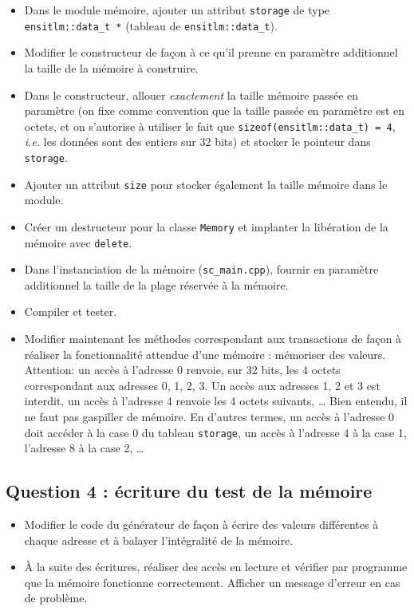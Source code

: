 \documentclass[12pt,a4paper]{article}
\begin{document}
\begin{itemize}
   \item Dans le module mémoire, ajouter un attribut \lstinline|storage| de type \lstinline|ensitlm::data_t *| (tableau de \lstinline|ensitlm::data_t|).\vv
   \item Modifier le constructeur de façon à ce qu'il prenne en paramètre additionnel la taille de la mémoire à construire.
   \item Dans le constructeur, allouer \textit{exactement} la taille mémoire passée en paramètre (on fixe comme convention que la taille passée en paramètre est en octets, et on s'autorise à utiliser le fait que \lstinline|sizeof(ensitlm::data_t) = 4|, \emph{i.e.} les données sont des entiers sur 32 bits) et stocker le pointeur dans \lstinline|storage|.\vv
   \item Ajouter un attribut \lstinline|size| pour stocker également la taille mémoire dans le module.\vv
   \item Créer un destructeur pour la classe \lstinline|Memory| et implanter la libération de la mémoire avec \lstinline|delete|.\vv
   \item Dans l'instanciation de la mémoire (\lstinline|sc_main.cpp|), fournir en paramètre additionnel la taille de la plage réservée à la mémoire.\vv
   \item Compiler et tester.\vv\vv
   \item Modifier maintenant les méthodes correspondant aux transactions de façon à réaliser la fonctionnalité attendue d'une mémoire : mémoriser des valeurs.
         Attention: un accès à l'adresse 0 renvoie, sur 32 bits, les 4 octets correspondant aux adresses 0, 1, 2, 3.
         Un accès aux adresses 1, 2 et 3 est interdit, un accès à l'adresse 4 renvoie les 4 octets suivants, \ldots
         Bien entendu, il ne faut pas gaspiller de mémoire.
         En d'autres termes, un accès à l'adresse 0 doit accéder à la case 0 du tableau \lstinline|storage|, un accès à l'adresse 4 à la case 1, l'adresse 8 à la case 2, \ldots
\end{itemize}

\subsection*{Question 4 : écriture du test de la mémoire}

\begin{itemize}
   \item Modifier le code du générateur de façon à écrire des valeurs différentes à chaque adresse et à balayer l'intégralité de la mémoire.\vv
   \item À la suite des écritures, réaliser des accès en lecture et vérifier par programme que la mémoire fonctionne correctement.
         Afficher un message d'erreur en cas de problème.
\end{itemize}
\end{document}

